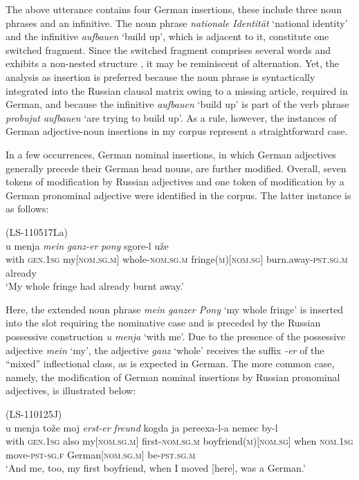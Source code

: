 \noindent The above utterance contains four German insertions, these include three noun phrases and an infinitive. The noun phrase \textit{nationale Identität} `national identity' and the infinitive \textit{aufbauen} `build up', which is adjacent to it, constitute one switched fragment. Since the switched fragment comprises several words and exhibits a non-nested structure \citep[cf.][97]{muysken-bilingual-2000}, it may be reminiscent of alternation. Yet, the analysis as insertion is preferred because the noun phrase is syntactically integrated into the Russian clausal matrix owing to a missing article, required in German, and because the infinitive \textit{aufbauen} ‘build up’ is part of the verb phrase \textit{probujut aufbauen} `are trying to build up'. As a rule, however, the instances of German adjective-noun insertions in my corpus represent a straightforward case. 

In a few occurrences, German nominal insertions, in which German adjectives generally precede their German head nouns, are further modified. Overall, seven tokens of modification by Russian adjectives and one token of modification by a German pronominal adjective were identified in the corpus. The latter instance is as follows:

\ea
\label{ex:4:27}
(LS-110517La)\\
\gll u menja \textit{mein} \textit{ganz-er} \textit{pony}  sgore-l uže\\
	with \textsc{gen.1sg} my[\textsc{nom.sg.m}] whole-\textsc{nom.sg.m} fringe(\textsc{m})[\textsc{nom.sg}] burn.away-\textsc{pst.sg.m} already\\
\glt `My whole fringe had already burnt away.'
\z

\noindent Here, the extended noun phrase \textit{mein ganzer Pony} `my whole fringe' is inserted into the slot requiring the nominative case and is preceded by the Russian possessive construction \textit{u menja} `with me'. Due to the presence of the possessive adjective \textit{mein} `my', the adjective \textit{ganz} `whole' receives the suffix \textit{-er} of the “mixed” inflectional class, as is expected in German. The more common case, namely, the modification of German nominal insertions by Russian pronominal adjectives, is illustrated below:

\ea
\label{ex:4:28}
(LS-110125J)\\
 \gll u menja tože moj \textit{erst-er} \textit{freund}  kogda ja pereexa-l-a nemec by-l\\
	with \textsc{gen.1sg} also my[\textsc{nom.sg.m}] first-\textsc{nom.sg.m} boyfriend(\textsc{m})[\textsc{nom.sg}] when \textsc{nom.1sg} move-\textsc{pst-sg.f} German[\textsc{nom.sg.m}] be-\textsc{pst.sg.m}\\
\glt `And me, too, my first boyfriend, when I moved [here], was a German.'
\z

